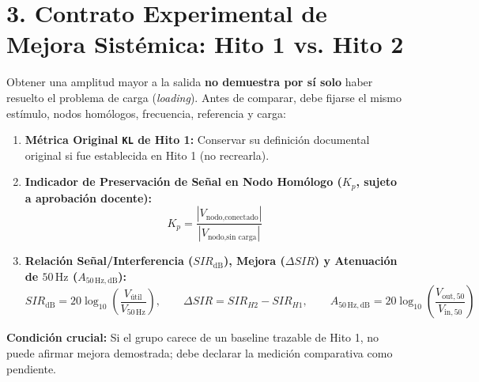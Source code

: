 \documentclass[10pt, a4paper]{article}
\begin{document}
\section*{3. Contrato Experimental de Mejora Sistémica: Hito 1 vs. Hito 2}
Obtener una amplitud mayor a la salida \textbf{no demuestra por sí solo} haber resuelto el problema de carga (\textit{loading}). Antes de comparar, debe fijarse el mismo estímulo, nodos homólogos, frecuencia, referencia y carga:
\begin{enumerate}
    \setlength{\itemsep}{2pt}
    \item \textbf{Métrica Original \texttt{KL} de Hito 1:} Conservar su definición documental original si fue establecida en Hito 1 (no recrearla).
    \item \textbf{Indicador de Preservación de Señal en Nodo Homólogo ($K_p$, sujeto a aprobación docente):}
    \begin{equation}
        \boxed{K_p = \frac{|V_{\text{nodo,conectado}}|}{|V_{\text{nodo,sin carga}}|}}
    \end{equation}
    \item \textbf{Relación Señal/Interferencia ($SIR_{\mathrm{dB}}$), Mejora ($\Delta SIR$) y Atenuación de $50\,\text{Hz}$ ($A_{50\,\text{Hz},\mathrm{dB}}$):}
    \begin{equation}
        \boxed{SIR_{\mathrm{dB}} = 20\log_{10}\left(\frac{V_{\text{útil}}}{V_{50\,\text{Hz}}}\right)}, \qquad \boxed{\Delta SIR = SIR_{H2} - SIR_{H1}}, \qquad \boxed{A_{50\,\text{Hz},\mathrm{dB}} = 20\log_{10}\left(\frac{V_{\mathrm{out},50}}{V_{\mathrm{in},50}}\right)}
    \end{equation}
\end{enumerate}
\textbf{Condición crucial:} Si el grupo carece de un baseline trazable de Hito 1, no puede afirmar mejora demostrada; debe declarar la medición comparativa como pendiente.
\end{document}
